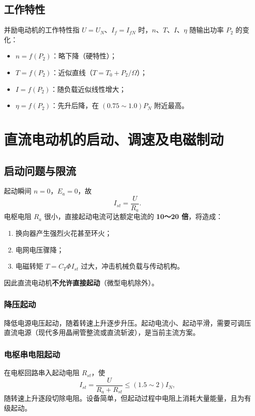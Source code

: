 \subsection{工作特性}
并励电动机的工作特性指 $U=U_N$、$I_f=I_{fN}$ 时，$n$、$T$、$I$、$\eta$ 随输出功率 $P_2$ 的变化：
\begin{itemize}
  \item $n=f(P_2)$：略下降（硬特性）；
  \item $T=f(P_2)$：近似直线（$T=T_0+P_2/\Omega$）；
  \item $I=f(P_2)$：随负载近似线性增大；
  \item $\eta=f(P_2)$：先升后降，在 $(0.75\sim1.0)P_N$ 附近最高。
\end{itemize}

\section{直流电动机的启动、调速及电磁制动}

\subsection{启动问题与限流}
起动瞬间 $n=0$，$E_a=0$，故
\begin{equation}
I_{st}=\frac{U}{R_a}.
\end{equation}
电枢电阻 $R_a$ 很小，直接起动电流可达额定电流的 \textbf{10～20 倍}，将造成：
\begin{enumerate}
  \item 换向器产生强烈火花甚至环火；
  \item 电网电压骤降；
  \item 电磁转矩 $T=C_T\Phi I_{st}$ 过大，冲击机械负载与传动机构。
\end{enumerate}
因此直流电动机\textbf{不允许直接起动}（微型电机除外）。

\subsubsection{降压起动}
降低电源电压起动，随着转速上升逐步升压。起动电流小、起动平滑，需要可调压直流电源（现代多用晶闸管整流或直流斩波），是当前主流方案。

\subsubsection{电枢串电阻起动}
在电枢回路串入起动电阻 $R_{st}$，使
\begin{equation}
I_{st}=\frac{U}{R_a+R_{st}}\le\left(1.5\sim2\right)I_N ,
\end{equation}
随转速上升逐段切除电阻。设备简单，但起动过程中电阻上消耗大量能量，且为有级起动。

